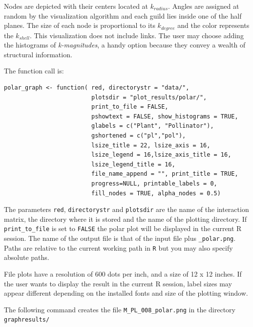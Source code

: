 \documentclass[12pt]{article}
\begin{document}
Nodes are depicted with their centers located at $k_{radius}$. Angles are assigned at random by the visualization algorithm and each guild lies inside one of the half planes. The size of each node is proportional to its $k_{degree}$ and the color represents the $k_{shell}$. This visualization does not include links. The user may choose adding the histograms of \textit{k-magnitudes}, a handy option because they convey a wealth of structural information.


\noindent The function call is:

\fontsize{3.5mm}{3.5mm}\selectfont
\begin{verbatim}
polar_graph <- function( red, directorystr = "data/", 
                         plotsdir = "plot_results/polar/", 
                         print_to_file = FALSE,     
                         pshowtext = FALSE, show_histograms = TRUE, 
                         glabels = c("Plant", "Pollinator"),
                         gshortened = c("pl","pol"),
                         lsize_title = 22, lsize_axis = 16,
                         lsize_legend = 16,lsize_axis_title = 16, 
                         lsize_legend_title = 16,
                         file_name_append = "", print_title = TRUE,
                         progress=NULL, printable_labels = 0, 
                         fill_nodes = TRUE, alpha_nodes = 0.5)
\end{verbatim}
\normalsize

The parameters \texttt{red}, \texttt{directorystr} and \texttt{plotsdir} are the name of the interaction matrix, the directory where it is stored and the name of the plotting directory. If \texttt{print\_to\_file} is set to \texttt{FALSE} the polar plot will be displayed in the current R session. The name of the output file is that of the input file
plus \texttt{\_polar.png}. Paths are relative to the current working path in \texttt{R} but you may also specify absolute paths.

File plots have a resolution of 600 dots per inch, and a size of 12 x 12 inches. If the user wants to display the result in the current R session, label sizes may appear different depending on the installed fonts and size of the plotting window.

The following command creates the file \texttt{M\_PL\_008\_polar.png} in the directory \texttt{graphresults/}
\end{document}
